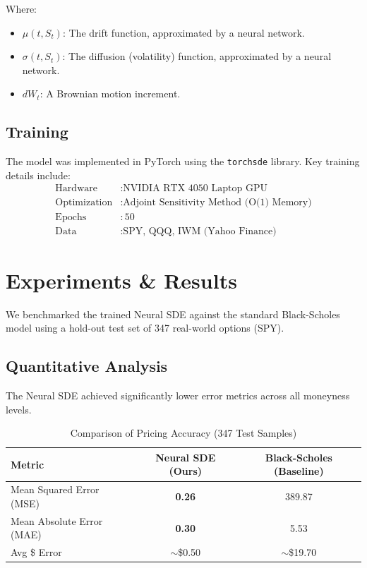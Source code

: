 \documentclass{article}
\begin{document}
Where:
\begin{itemize}
    \item $\mu(t, S_t)$: The drift function, approximated by a neural network.
    \item $\sigma(t, S_t)$: The diffusion (volatility) function, approximated by a neural network.
    \item $dW_t$: A Brownian motion increment.
\end{itemize}

\subsection{Training}
The model was implemented in PyTorch using the \texttt{torchsde} library. Key training details include:
\begin{align*}
    \text{Hardware} & : \text{NVIDIA RTX 4050 Laptop GPU} \\
    \text{Optimization} & : \text{Adjoint Sensitivity Method (O(1) Memory)} \\
    \text{Epochs} & : 50 \\
    \text{Data} & : \text{SPY, QQQ, IWM (Yahoo Finance)}
\end{align*}

\section{Experiments \& Results}
We benchmarked the trained Neural SDE against the standard Black-Scholes model using a hold-out test set of 347 real-world options (SPY).

\subsection{Quantitative Analysis}
The Neural SDE achieved significantly lower error metrics across all moneyness levels.

\begin{table}[h]
\centering
\caption{Comparison of Pricing Accuracy (347 Test Samples)}
\label{tab:results}
\begin{tabular}{lcc}
\toprule
\textbf{Metric} & \textbf{Neural SDE (Ours)} & \textbf{Black-Scholes (Baseline)} \\
\midrule
Mean Squared Error (MSE) & \textbf{0.26} & 389.87 \\
Mean Absolute Error (MAE) & \textbf{0.30} & 5.53 \\
Avg \$ Error & $\sim$\$0.50 & $\sim$\$19.70 \\
\bottomrule
\end{tabular}
\end{table}
\end{document}
